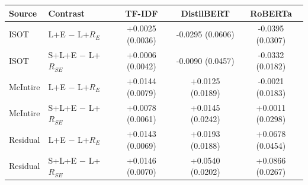 \begin{tabular}{@{}llccc@{}}
\toprule
Source & Contrast & TF-IDF & DistilBERT & RoBERTa\\
\midrule
ISOT & L+E $-$ L+$R_E$ & +0.0025 (0.0036) & -0.0295 (0.0606) & -0.0395 (0.0307)\\
ISOT & S+L+E $-$ L+$R_{SE}$ & +0.0006 (0.0042) & -0.0090 (0.0457) & -0.0332 (0.0182)\\
McIntire & L+E $-$ L+$R_E$ & +0.0144 (0.0079) & +0.0125 (0.0189) & -0.0021 (0.0183)\\
McIntire & S+L+E $-$ L+$R_{SE}$ & +0.0078 (0.0061) & +0.0145 (0.0242) & +0.0011 (0.0298)\\
Residual & L+E $-$ L+$R_E$ & +0.0143 (0.0069) & +0.0193 (0.0188) & +0.0678 (0.0454)\\
Residual & S+L+E $-$ L+$R_{SE}$ & +0.0146 (0.0070) & +0.0540 (0.0202) & +0.0866 (0.0267)\\
\bottomrule
\end{tabular}
